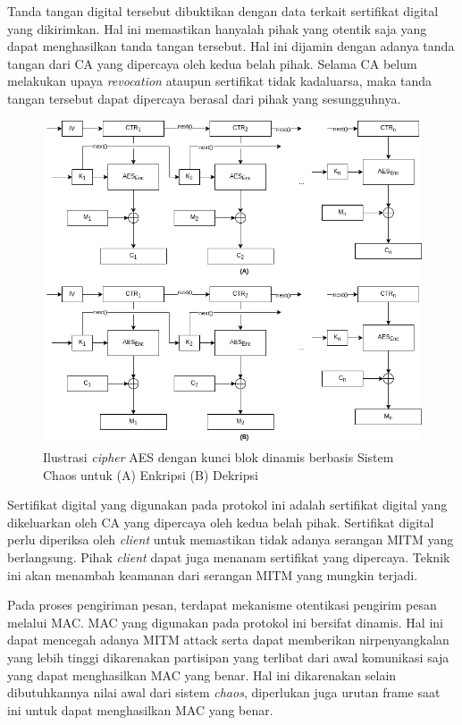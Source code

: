 Tanda tangan digital tersebut dibuktikan dengan data terkait sertifikat digital yang dikirimkan. Hal ini memastikan hanyalah pihak yang otentik saja yang dapat menghasilkan tanda tangan tersebut. Hal ini dijamin dengan adanya tanda tangan dari CA yang dipercaya oleh kedua belah pihak. Selama CA belum melakukan upaya \emph{revocation} ataupun sertifikat tidak kadaluarsa, maka tanda tangan tersebut dapat dipercaya berasal dari pihak yang sesungguhnya.

\begin{figure}[!h]
  \centering
  \includegraphics[width=\textwidth]{chapters/res/chapter-3/img/cipher.png}
  \caption{Ilustrasi \emph{cipher} AES dengan kunci blok dinamis berbasis Sistem Chaos untuk (A) Enkripsi (B) Dekripsi} \label{fig:tls.cipher}
\end{figure}

Sertifikat digital yang digunakan pada protokol ini adalah sertifikat digital yang dikeluarkan oleh CA yang dipercaya oleh kedua belah pihak. Sertifikat digital perlu diperiksa oleh \emph{client} untuk memastikan tidak adanya serangan MITM yang berlangsung. Pihak \emph{client} dapat juga menanam sertifikat yang dipercaya. Teknik ini akan menambah keamanan dari serangan MITM yang mungkin terjadi. 

Pada proses pengiriman pesan, terdapat mekanisme otentikasi pengirim pesan melalui MAC. MAC yang digunakan pada protokol ini bersifat dinamis. Hal ini dapat mencegah adanya MITM attack serta dapat memberikan nirpenyangkalan yang lebih tinggi dikarenakan partisipan yang terlibat dari awal komunikasi saja yang dapat menghasilkan MAC yang benar. Hal ini dikarenakan selain dibutuhkannya nilai awal dari sistem \emph{chaos}, diperlukan juga urutan frame saat ini untuk dapat menghasilkan MAC yang benar.

